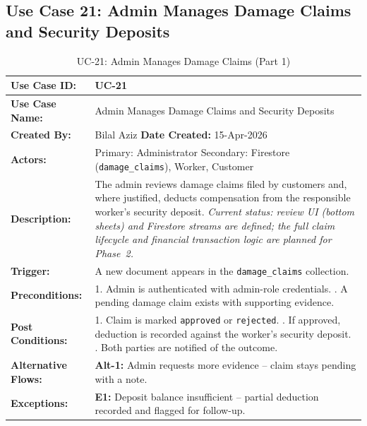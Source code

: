 \subsection*{Use Case 21: Admin Manages Damage Claims and Security Deposits}

{\small
\renewcommand{\arraystretch}{1.05}
\begin{table}[H]
\centering
\begin{tabular}{|p{3cm}|p{11.2cm}|}
\hline
\textbf{Use Case ID:} & UC-21 \\ \hline
\textbf{Use Case Name:} & Admin Manages Damage Claims and Security Deposits \\ \hline
\textbf{Created By:} & Bilal Aziz \hfill \textbf{Date Created:} 15-Apr-2026 \\ \hline
\textbf{Actors:} & Primary: Administrator \quad Secondary: Firestore (\texttt{damage\_claims}), Worker, Customer \\ \hline
\textbf{Description:} & The admin reviews damage claims filed by customers and, where justified, deducts compensation from the responsible worker's security deposit. \textit{Current status: review UI (bottom sheets) and Firestore streams are defined; the full claim lifecycle and financial transaction logic are planned for Phase~2.} \\ \hline
\textbf{Trigger:} & A new document appears in the \texttt{damage\_claims} collection. \\ \hline
\textbf{Preconditions:} & 1. Admin is authenticated with admin-role credentials. \newline 2. A pending damage claim exists with supporting evidence. \\ \hline
\textbf{Post Conditions:} & 1. Claim is marked \texttt{approved} or \texttt{rejected}. \newline 2. If approved, deduction is recorded against the worker's security deposit. \newline 3. Both parties are notified of the outcome. \\ \hline
\textbf{Alternative Flows:} & \textbf{Alt-1:} Admin requests more evidence -- claim stays pending with a note. \\ \hline
\textbf{Exceptions:} & \textbf{E1:} Deposit balance insufficient -- partial deduction recorded and flagged for follow-up. \\ \hline
\end{tabular}
\caption*{UC-21: Admin Manages Damage Claims (Part 1)}
\end{table}
}

